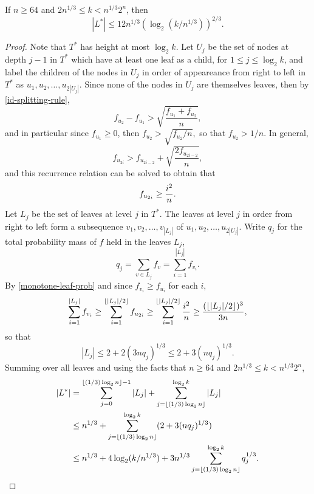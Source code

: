 \begin{prop}
  If $n \ge 64$ and $2 n^{1/3} \le k < n^{1/3} 2^n$, then
  \[
    |L^*| \le 12 n^{1/3} {\left( \log_2 (k/n^{1/3}) \right)}^{2/3} .
  \]
\end{prop}
\begin{proof}
  Note that $T^*$ has height at most $\log_2 k$. Let $U_j$ be the set
  of nodes at depth $j - 1$ in $T^*$ which have at least one leaf as a
  child, for $1 \le j \le \log_2 k$, and label the children of the
  nodes in $U_j$ in order of appeareance from right to left in $T^*$
  as $u_1, u_2, \dots, u_{2 |U_j|}$. Since none of the nodes in $U_j$
  are themselves leaves, then by \eqref{id-splitting-rule},
  \[
    f_{u_2} - f_{u_1} > \sqrt{\frac{f_{u_1} + f_{u_2}}{n} } ,
  \]
  and in particular since $f_{u_1} \ge 0$, then
  $f_{u_2} > \sqrt{f_{u_2}/n},$ so that $f_{u_2} > 1/n$. In general,
  \[
    f_{u_{2i}} > f_{u_{2i - 2}} + \sqrt{ \frac{2 f_{u_{2i - 2}}}{n} }, %
  \]
  and this recurrence relation can be solved to obtain that
  \begin{align}
    f_{u_{2i}} \ge \frac{i^2}{n} . \eqlabel{monotone-leaf-prob}
  \end{align}
  Let $L_j$ be the set of leaves at level $j$ in $T^*$. The leaves at
  level $j$ in order from right to left form a subsequence
  $v_1, v_2, \dots, v_{|L_j|}$ of $u_1, u_2, \dots, u_{2|U_j|}$. Write
  $q_j$ for the total probability mass of $f$ held in the leaves
  $L_j$, \ie
  \[
    q_j = \sum_{v \in L_j} f_v = \sum_{i = 1}^{|L_j|} f_{v_i} .
  \]
  By \eqref{monotone-leaf-prob} and since $f_{v_i} \ge f_{u_i}$ for
  each $i$,
  \begin{align*}
    \sum_{i = 1}^{|L_j|} f_{v_i} \ge \sum_{i = 1}^{\floor{|L_j|/2}} f_{u_{2i}} 
                                 \ge \sum_{i = 1}^{\floor{|L_j|/2}} \frac{i^2}{n} 
                                 \ge \frac{(\floor{|L_j|/2})^3}{3 n} ,
  \end{align*}
  so that
  \[
    |L_j| \le 2 + 2(3 n q_j)^{1/3} \le 2 + 3 (n q_j)^{1/3} .
  \]
  Summing over all leaves and using the facts that $n \ge 64$ and
  $2n^{1/3} \le k < n^{1/3} 2^n$,
  \begin{align*}
    |L^*| &= \sum_{j = 0}^{\floor{(1/3) \log_2 n} - 1} |L_j| + \sum_{j = \floor{(1/3) \log_2 n}}^{\log_2 k} |L_j| \\
          &\le n^{1/3} + \sum_{j = \floor{(1/3) \log_2 n}}^{\log_2 k} (2 + 3 (n q_j)^{1/3}) \\
          &\le n^{1/3} + 4 \log_2 (k/n^{1/3}) + 3 n^{1/3} \sum_{j = \floor{(1/3) \log_2 n}}^{\log_2 k} q_{j}^{1/3} .

\end{align*}
\end{proof}
